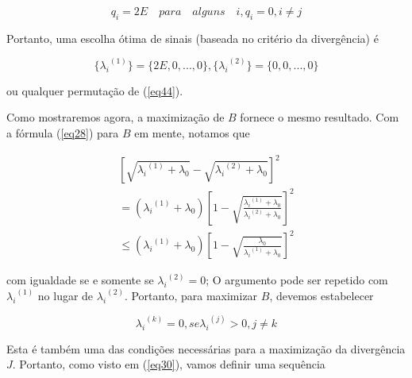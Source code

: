 \documentclass{sbrt2017port}
\begin{document}
\begin{equation}
	q_i = 2E \quad para \quad alguns \quad i, q_i = 0, i \neq j
	\label{eq33}
\end{equation}

Portanto, uma escolha ótima de sinais (baseada no critério da divergência) é

\begin{equation}
	\{ {\lambda_i}^{(1)} \} = \{ 2E, 0,...,0 \}, \{ {\lambda_i}^{(2)} \} = \{ 0, 0,...,0 \}
	\label{eq34}
\end{equation}

ou qualquer permutação de (\ref{eq44}).

Como mostraremos agora, a maximização de $B$ fornece o mesmo resultado. Com a fórmula (\ref{eq28}) para $B$ em mente, notamos que

\begin{equation}\label{eq35}
	\begin{split}
	{\left[ \sqrt{{\lambda_i}^{(1)}+ \lambda_0} - \sqrt{{\lambda_i}^{(2)}+ \lambda_0} \right]}^2 \\
	= ( {\lambda_i}^{(1)}+ \lambda_0 ) {\left[ 1 - \sqrt{\frac{{\lambda_i}^{(1)}+ \lambda_0}{{\lambda_i}^{(2)}+ \lambda_0}} \right]}^2 \\
	\leq ( {\lambda_i}^{(1)}+ \lambda_0 ) {\left[ 1 - \sqrt{\frac{\lambda_0}{{\lambda_i}^{(1)}+ \lambda_0}} \right]}^2
	\end{split}
\end{equation}

com igualdade se e somente se ${\lambda_i}^{(2)} = 0$; O argumento pode ser repetido com ${\lambda_i}^{(1)}$ no lugar de ${\lambda_i}^{(2)}$. Portanto, para maximizar $B$, devemos estabelecer

\begin{equation}
	{\lambda_i}^{(k)} = 0, se {\lambda_i}^{(j)} > 0, j \neq k
	\label{eq36}
\end{equation}

Esta é também uma das condições necessárias para a maximização da divergência $J$. Portanto, como visto em (\ref{eq30}), vamos definir uma sequência
\end{document}
